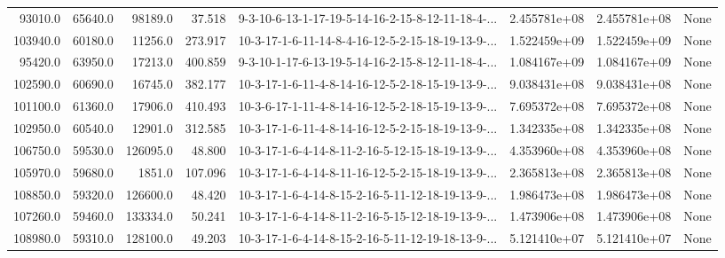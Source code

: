\begin{tabular}{rrrrlrrl}
  93010.0 &  65640.0 &        98189.0 &             37.518 &  9-3-10-6-13-1-17-19-5-14-16-2-15-8-12-11-18-4-... &  2.455781e+08 &  2.455781e+08 &   None \\
 103940.0 &  60180.0 &        11256.0 &            273.917 &  10-3-17-1-6-11-14-8-4-16-12-5-2-15-18-19-13-9-... &  1.522459e+09 &  1.522459e+09 &   None \\
  95420.0 &  63950.0 &        17213.0 &            400.859 &  9-3-10-1-17-6-13-19-5-14-16-2-15-8-12-11-18-4-... &  1.084167e+09 &  1.084167e+09 &   None \\
 102590.0 &  60690.0 &        16745.0 &            382.177 &  10-3-17-1-6-11-4-8-14-16-12-5-2-18-15-19-13-9-... &  9.038431e+08 &  9.038431e+08 &   None \\
 101100.0 &  61360.0 &        17906.0 &            410.493 &  10-3-6-17-1-11-4-8-14-16-12-5-2-18-15-19-13-9-... &  7.695372e+08 &  7.695372e+08 &   None \\
 102950.0 &  60540.0 &        12901.0 &            312.585 &  10-3-17-1-6-11-4-8-14-16-12-5-2-15-18-19-13-9-... &  1.342335e+08 &  1.342335e+08 &   None \\
 106750.0 &  59530.0 &       126095.0 &             48.800 &  10-3-17-1-6-4-14-8-11-2-16-5-12-15-18-19-13-9-... &  4.353960e+08 &  4.353960e+08 &   None \\
 105970.0 &  59680.0 &         1851.0 &            107.096 &  10-3-17-1-6-4-14-8-11-16-12-5-2-15-18-19-13-9-... &  2.365813e+08 &  2.365813e+08 &   None \\
 108850.0 &  59320.0 &       126600.0 &             48.420 &  10-3-17-1-6-4-14-8-15-2-16-5-11-12-18-19-13-9-... &  1.986473e+08 &  1.986473e+08 &   None \\
 107260.0 &  59460.0 &       133334.0 &             50.241 &  10-3-17-1-6-4-14-8-11-2-16-5-15-12-18-19-13-9-... &  1.473906e+08 &  1.473906e+08 &   None \\
 108980.0 &  59310.0 &       128100.0 &             49.203 &  10-3-17-1-6-4-14-8-15-2-16-5-11-12-19-18-13-9-... &  5.121410e+07 &  5.121410e+07 &   None \\
\bottomrule
\end{tabular}
